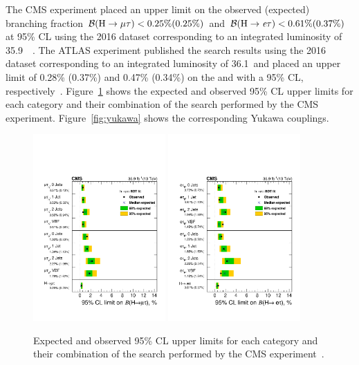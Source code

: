 The CMS experiment placed an upper limit on the observed (expected) branching fraction $\mathcal{B}(\text{H} \to \mu \tau) < 0.25\% (0.25\%)$ and $\mathcal{B}(\text{H} \to \textit{e} \tau) < 0.61\% (0.37\%)$ at 95\% CL using the 2016 dataset corresponding to an integrated luminosity of 35.9~\fb~\cite{Sirunyan:2017xzt}. The ATLAS experiment published the search results using the 2016 dataset corresponding to an integrated luminosity of 36.1~\fb and placed an upper limit of 0.28\% (0.37\%) and 0.47\% (0.34\%) on the \BHmt and \BHet with a 95\% CL, respectively~\cite{Aad:2019ugc}. Figure~\ref{fig:bh} shows the expected and observed 95\% CL upper limits for each category and their combination of the search performed by the CMS experiment. Figure~\ref{fig:yukawa} shows the corresponding Yukawa couplings.

\begin{figure}[htbp]
  \centering
  \includegraphics[width=0.45\textwidth]{plots/chapter2/BHmt.pdf}
  \includegraphics[width=0.45\textwidth]{plots/chapter2/BHet.pdf}
  \caption{Expected and observed 95\% CL upper limits for each category and their combination of the search performed by the CMS experiment~\cite{Sirunyan:2019shc}.}
  \label{fig:bh}
\end{figure}

